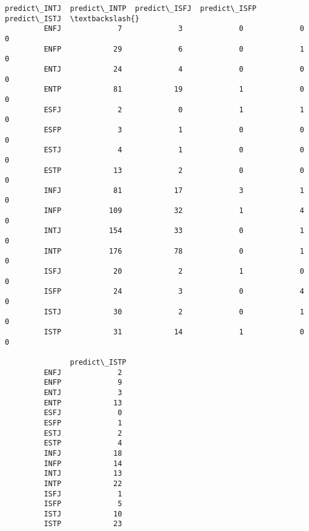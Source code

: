 \documentclass[11pt]{article}
\begin{document}
\begin{Verbatim}[commandchars=\\\{\}]
               predict\_INTJ  predict\_INTP  predict\_ISFJ  predict\_ISFP  predict\_ISTJ  \textbackslash{}
         ENFJ             7             3             0             0             0   
         ENFP            29             6             0             1             0   
         ENTJ            24             4             0             0             0   
         ENTP            81            19             1             0             0   
         ESFJ             2             0             1             1             0   
         ESFP             3             1             0             0             0   
         ESTJ             4             1             0             0             0   
         ESTP            13             2             0             0             0   
         INFJ            81            17             3             1             0   
         INFP           109            32             1             4             0   
         INTJ           154            33             0             1             0   
         INTP           176            78             0             1             0   
         ISFJ            20             2             1             0             0   
         ISFP            24             3             0             4             0   
         ISTJ            30             2             0             1             0   
         ISTP            31            14             1             0             0   
         
               predict\_ISTP  
         ENFJ             2  
         ENFP             9  
         ENTJ             3  
         ENTP            13  
         ESFJ             0  
         ESFP             1  
         ESTJ             2  
         ESTP             4  
         INFJ            18  
         INFP            14  
         INTJ            13  
         INTP            22  
         ISFJ             1  
         ISFP             5  
         ISTJ            10  
         ISTP            23  
\end{Verbatim}
            
\end{document}
